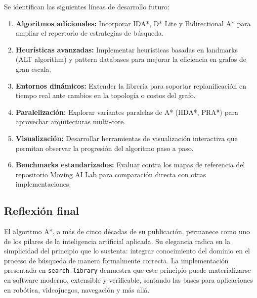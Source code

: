 Se identifican las siguientes líneas de desarrollo futuro:

\begin{enumerate}
    \item \textbf{Algoritmos adicionales:} Incorporar IDA*, D* Lite y Bidirectional A* para ampliar el repertorio de estrategias de búsqueda.
    
    \item \textbf{Heurísticas avanzadas:} Implementar heurísticas basadas en landmarks (ALT algorithm) y pattern databases para mejorar la eficiencia en grafos de gran escala.
    
    \item \textbf{Entornos dinámicos:} Extender la librería para soportar replanificación en tiempo real ante cambios en la topología o costos del grafo.
    
    \item \textbf{Paralelización:} Explorar variantes paralelas de A* (HDA*, PRA*) para aprovechar arquitecturas multi-core.
    
    \item \textbf{Visualización:} Desarrollar herramientas de visualización interactiva que permitan observar la progresión del algoritmo paso a paso.
    
    \item \textbf{Benchmarks estandarizados:} Evaluar contra los mapas de referencia del repositorio Moving AI Lab \cite{sturtevant2012benchmarks} para comparación directa con otras implementaciones.
\end{enumerate}

\subsection{Reflexión final}

El algoritmo A*, a más de cinco décadas de su publicación, permanece como uno de los pilares de la inteligencia artificial aplicada. Su elegancia radica en la simplicidad del principio que lo sustenta: integrar conocimiento del dominio en el proceso de búsqueda de manera formalmente correcta. La implementación presentada en \texttt{search-library} demuestra que este principio puede materializarse en software moderno, extensible y verificable, sentando las bases para aplicaciones en robótica, videojuegos, navegación y más allá.
